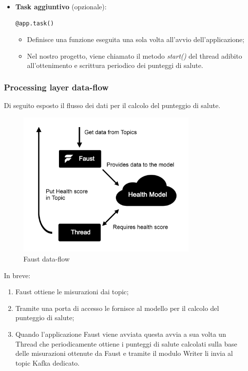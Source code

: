 \begin{itemize}
    \item \textbf{Task aggiuntivo} (opzionale): 
    \begin{lstlisting}[style=code]
    @app.task()
        \end{lstlisting}  
    \begin{itemize}
        \item Definisce una funzione eseguita una sola volta all'avvio dell'applicazione;
        \item Nel nostro progetto, viene chiamato il metodo \textit{start()} del thread adibito all'ottenimento e scrittura periodico dei punteggi di salute.
    \end{itemize}
\end{itemize}

\subsubsection{Processing layer data-flow}
Di seguito esposto il flusso dei dati per il calcolo del punteggio di salute.

\begin{figure}[H]
    \centering
    \includegraphics[width=0.8\textwidth]{../Images/SpecificaTecnica/faustFlow.png}
    \caption{Faust data-flow}
    \label{fig: FaustDataflow}
\end{figure}
In breve:
\begin{enumerate}
    \item Faust ottiene le misurazioni dai topic;
    \item Tramite una porta di accesso le fornisce al modello per il calcolo del punteggio di salute;
    \item Quando l'applicazione Faust viene avviata questa avvia a sua volta un Thread che periodicamente ottiene i punteggi di salute calcolati sulla base delle misurazioni ottenute da Faust e tramite il modulo Writer li invia al topic Kafka dedicato.
\end{enumerate}

